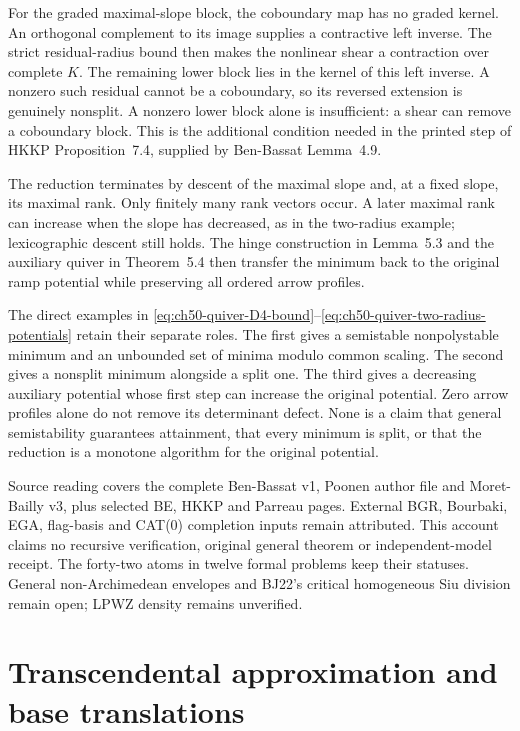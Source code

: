 For the graded maximal-slope block, the coboundary map has
no graded kernel. An orthogonal complement to its image
supplies a contractive left inverse. The strict residual-radius
bound then makes the nonlinear shear a contraction over complete
$K$. The remaining lower block lies in the kernel of this
left inverse. A nonzero such residual cannot be a coboundary,
so its reversed extension is genuinely nonsplit. A nonzero
lower block alone is insufficient: a shear can remove a
coboundary block. This is the additional condition needed
in the printed step of HKKP Proposition~7.4, supplied by
Ben-Bassat Lemma~4.9.

The reduction terminates by descent of the maximal slope and,
at a fixed slope, its maximal rank. Only finitely many rank
vectors occur. A later maximal rank can increase when the
slope has decreased, as in the two-radius example; lexicographic
descent still holds. The hinge construction in Lemma~5.3 and
the auxiliary quiver in Theorem~5.4 then transfer the minimum
back to the original ramp potential while preserving all
ordered arrow profiles.

The direct examples in
\eqref{eq:ch50-quiver-D4-bound}--\eqref{eq:ch50-quiver-two-radius-potentials}
retain their separate roles. The first gives a semistable
nonpolystable minimum and an unbounded set of minima modulo
common scaling. The second gives a nonsplit minimum alongside
a split one. The third gives a decreasing auxiliary potential
whose first step can increase the original potential. Zero
arrow profiles alone do not remove its determinant defect.
None is a claim that general semistability guarantees attainment,
that every minimum is split, or that the reduction is a monotone
algorithm for the original potential.

Source reading covers the complete Ben-Bassat v1, Poonen author file
and Moret-Bailly v3, plus selected BE, HKKP and Parreau pages.
External BGR, Bourbaki, EGA, flag-basis and CAT(0) completion
inputs remain attributed. This account claims no recursive
verification, original general theorem or independent-model receipt.
The forty-two atoms in twelve formal problems keep their statuses.
General non-Archimedean envelopes and BJ22's critical homogeneous
Siu division remain open; LPWZ density remains unverified.

\section{Transcendental approximation and base translations}
\label{sec:appL-transcendental-ytd-boundary}

